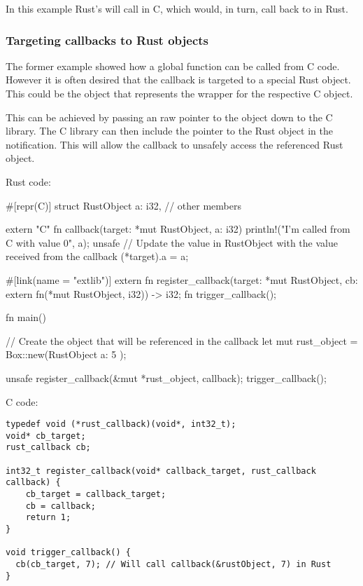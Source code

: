 In this example Rust's  will call  in C, which would, in turn, call back to 
 in Rust.

\subsubsection*{Targeting callbacks to Rust objects}

The former example showed how a global function can be called from C code. However it is often desired that the callback 
is targeted to a special Rust object. This could be the object that represents the wrapper for the respective C object.

\blank

This can be achieved by passing an raw pointer to the object down to the C library. The C library can then include the 
pointer to the Rust object in the notification. This will allow the callback to unsafely access the referenced Rust object.

\blank

Rust code:

\begin{rustc}
#[repr(C)]
struct RustObject {
    a: i32,
    // other members
}

extern "C" fn callback(target: *mut RustObject, a: i32) {
    println!("I'm called from C with value {0}", a);
    unsafe {
        // Update the value in RustObject with the value received from the callback
        (*target).a = a;
    }
}

#[link(name = "extlib")]
extern {
   fn register_callback(target: *mut RustObject,
                        cb: extern fn(*mut RustObject, i32)) -> i32;
   fn trigger_callback();
}

fn main() {
    // Create the object that will be referenced in the callback
    let mut rust_object = Box::new(RustObject { a: 5 });

    unsafe {
        register_callback(&mut *rust_object, callback);
        trigger_callback();
    }
}
\end{rustc}

C code:

\begin{verbatim}
typedef void (*rust_callback)(void*, int32_t);
void* cb_target;
rust_callback cb;

int32_t register_callback(void* callback_target, rust_callback callback) {
    cb_target = callback_target;
    cb = callback;
    return 1;
}

void trigger_callback() {
  cb(cb_target, 7); // Will call callback(&rustObject, 7) in Rust
}
\end{verbatim}

